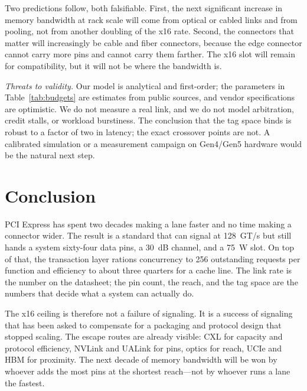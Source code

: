 \documentclass[10pt,letterpaper]{article}
\begin{document}
Two predictions follow, both falsifiable. First, the next significant increase in memory bandwidth at rack scale will come from optical or cabled links and from pooling, not from another doubling of the x16 rate. Second, the connectors that matter will increasingly be cable and fiber connectors, because the edge connector cannot carry more pins and cannot carry them farther. The x16 slot will remain for compatibility, but it will not be where the bandwidth is.

\emph{Threats to validity.} Our model is analytical and first-order; the parameters in Table~\ref{tab:budgets} are estimates from public sources, and vendor specifications are optimistic. We do not measure a real link, and we do not model arbitration, credit stalls, or workload burstiness. The conclusion that the tag space binds is robust to a factor of two in latency; the exact crossover points are not. A calibrated simulation or a measurement campaign on Gen4/Gen5 hardware would be the natural next step.

\section{Conclusion}

PCI Express has spent two decades making a lane faster and no time making a connector wider. The result is a standard that can signal at 128~GT/s but still hands a system sixty-four data pins, a 30~dB channel, and a 75~W slot. On top of that, the transaction layer rations concurrency to 256 outstanding requests per function and efficiency to about three quarters for a cache line. The link rate is the number on the datasheet; the pin count, the reach, and the tag space are the numbers that decide what a system can actually do.

The x16 ceiling is therefore not a failure of signaling. It is a success of signaling that has been asked to compensate for a packaging and protocol design that stopped scaling. The escape routes are already visible: CXL for capacity and protocol efficiency, NVLink and UALink for pins, optics for reach, UCIe and HBM for proximity. The next decade of memory bandwidth will be won by whoever adds the most pins at the shortest reach---not by whoever runs a lane the fastest.
\end{document}
